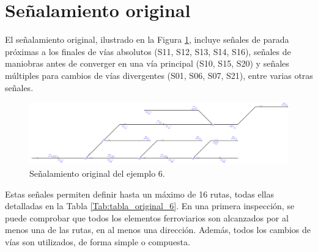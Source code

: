 \section{Señalamiento original}

    El señalamiento original, ilustrado en la Figura \ref{fig:EJ6_2}, incluye señales de parada próximas a los finales de vías absolutos (S11, S12, S13, S14, S16), señales de maniobras antes de converger en una vía principal (S10, S15, S20) y señales múltiples para cambios de vías divergentes (S01, S06, S07, S21), entre varias otras señales.
    
    \begin{figure}[H]
    	\centering
    	\includegraphics[width=1\textwidth]{resultados-obtenidos/ejemplo6/images/6_original.png}
    	\centering\caption{Señalamiento original del ejemplo 6.}
    	\label{fig:EJ6_2}
    \end{figure}
    
    Estas señales permiten definir hasta un máximo de 16 rutas, todas ellas detalladas en la Tabla \ref{Tab:tabla_original_6}. En una primera inspección, se puede comprobar que todos los elementos ferroviarios son alcanzados por al menos una de las rutas, en al menos una dirección. Además, todos los cambios de vías son utilizados, de forma simple o compuesta. 
    
